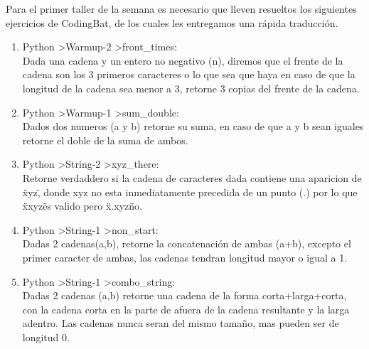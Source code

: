 Para el primer taller de la semana es necesario que lleven resueltos los siguientes ejercicios de CodingBat\cite{Codingbat}, de los cuales les entregamos una rápida traducción.

\begin{enumerate}
	\item Python \textgreater Warmup-2 \textgreater front\_times:\\
		Dada una cadena y un entero no negativo (n), diremos que el frente de la cadena son los 3 primeros caracteres o lo que sea que haya en caso de que la longitud de la cadena sea menor a 3, retorne 3 copias del frente de la cadena. 

	\item Python \textgreater Warmup-1 \textgreater sum\_double:\\
		Dados dos numeros (a y b) retorne su suma, en caso de que a y b sean iguales retorne el doble de la suma de ambos.

	\item Python \textgreater String-2 \textgreater xyz\_there:\\
		Retorne verdaddero si la cadena de caracteres dada contiene una aparicion de \"xyz\", donde xyz no esta inmediatamente precedida de un punto (.) por lo que \"xxyz\" es valido pero \"x.xyz\" no.
	
	\item Python \textgreater String-1 \textgreater non\_start:\\
		Dadas 2 cadenas(a,b), retorne la concatenación de ambas (a+b), excepto el primer caracter de ambas, las cadenas tendran longitud mayor o igual a 1.

	\item Python \textgreater String-1 \textgreater combo\_string:\\
		Dadas 2 cadenas (a,b) retorne una cadena de la forma corta+larga+corta, con la cadena corta en la parte de afuera de la cadena resultante y la larga adentro. Las cadenas nunca seran del mismo tamaño, mas pueden ser de longitud 0. 
\end{enumerate}
